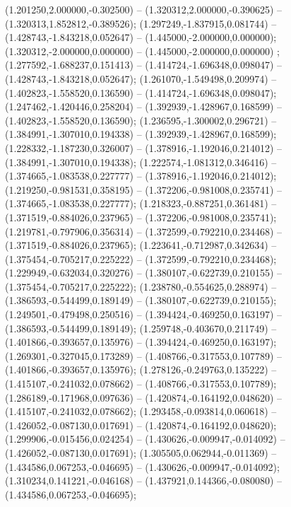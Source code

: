  (1.201250,2.000000,-0.302500) -- (1.320312,2.000000,-0.390625) -- (1.320313,1.852812,-0.389526);
 (1.297249,-1.837915,0.081744) -- (1.428743,-1.843218,0.052647) -- (1.445000,-2.000000,0.000000);
 (1.320312,-2.000000,0.000000) -- (1.445000,-2.000000,0.000000) ;
 (1.277592,-1.688237,0.151413) -- (1.414724,-1.696348,0.098047) -- (1.428743,-1.843218,0.052647);
 (1.261070,-1.549498,0.209974) -- (1.402823,-1.558520,0.136590) -- (1.414724,-1.696348,0.098047);
 (1.247462,-1.420446,0.258204) -- (1.392939,-1.428967,0.168599) -- (1.402823,-1.558520,0.136590);
 (1.236595,-1.300002,0.296721) -- (1.384991,-1.307010,0.194338) -- (1.392939,-1.428967,0.168599);
 (1.228332,-1.187230,0.326007) -- (1.378916,-1.192046,0.214012) -- (1.384991,-1.307010,0.194338);
 (1.222574,-1.081312,0.346416) -- (1.374665,-1.083538,0.227777) -- (1.378916,-1.192046,0.214012);
 (1.219250,-0.981531,0.358195) -- (1.372206,-0.981008,0.235741) -- (1.374665,-1.083538,0.227777);
 (1.218323,-0.887251,0.361481) -- (1.371519,-0.884026,0.237965) -- (1.372206,-0.981008,0.235741);
 (1.219781,-0.797906,0.356314) -- (1.372599,-0.792210,0.234468) -- (1.371519,-0.884026,0.237965);
 (1.223641,-0.712987,0.342634) -- (1.375454,-0.705217,0.225222) -- (1.372599,-0.792210,0.234468);
 (1.229949,-0.632034,0.320276) -- (1.380107,-0.622739,0.210155) -- (1.375454,-0.705217,0.225222);
 (1.238780,-0.554625,0.288974) -- (1.386593,-0.544499,0.189149) -- (1.380107,-0.622739,0.210155);
 (1.249501,-0.479498,0.250516) -- (1.394424,-0.469250,0.163197) -- (1.386593,-0.544499,0.189149);
 (1.259748,-0.403670,0.211749) -- (1.401866,-0.393657,0.135976) -- (1.394424,-0.469250,0.163197);
 (1.269301,-0.327045,0.173289) -- (1.408766,-0.317553,0.107789) -- (1.401866,-0.393657,0.135976);
 (1.278126,-0.249763,0.135222) -- (1.415107,-0.241032,0.078662) -- (1.408766,-0.317553,0.107789);
 (1.286189,-0.171968,0.097636) -- (1.420874,-0.164192,0.048620) -- (1.415107,-0.241032,0.078662);
 (1.293458,-0.093814,0.060618) -- (1.426052,-0.087130,0.017691) -- (1.420874,-0.164192,0.048620);
 (1.299906,-0.015456,0.024254) -- (1.430626,-0.009947,-0.014092) -- (1.426052,-0.087130,0.017691);
 (1.305505,0.062944,-0.011369) -- (1.434586,0.067253,-0.046695) -- (1.430626,-0.009947,-0.014092);
 (1.310234,0.141221,-0.046168) -- (1.437921,0.144366,-0.080080) -- (1.434586,0.067253,-0.046695);
